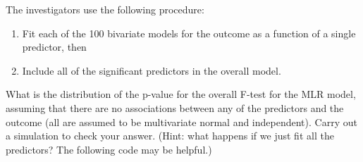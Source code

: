 \documentclass[
  letterpaper,
  DIV=11,
  numbers=noendperiod]{scrartcl}
\begin{document}
The investigators use the following procedure:

\begin{enumerate}
\def\labelenumi{\arabic{enumi}.}
\item
  Fit each of the 100 bivariate models for the outcome as a function of
  a single predictor, then
\item
  Include all of the significant predictors in the overall model.
\end{enumerate}

What is the distribution of the p-value for the overall F-test for the
MLR model, assuming that there are no associations between any of the
predictors and the outcome (all are assumed to be multivariate normal
and independent). Carry out a simulation to check your answer. (Hint:
what happens if we just fit all the predictors? The following code may
be helpful.)
\end{document}
